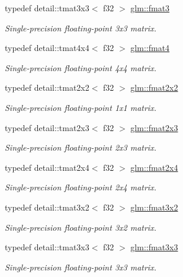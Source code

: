 \begin{DoxyCompactItemize}
typedef detail\-::tmat3x3$<$ f32 $>$ \hyperlink{group__gtc__type__precision_ga97f5385bc271a35cbbff8ac6a420c849}{glm\-::fmat3}
\begin{DoxyCompactList}\small\item\em Single-\/precision floating-\/point 3x3 matrix. \end{DoxyCompactList}\item 
typedef detail\-::tmat4x4$<$ f32 $>$ \hyperlink{group__gtc__type__precision_ga055416da4fe01f31008a03b52a80d174}{glm\-::fmat4}
\begin{DoxyCompactList}\small\item\em Single-\/precision floating-\/point 4x4 matrix. \end{DoxyCompactList}\item 
typedef detail\-::tmat2x2$<$ f32 $>$ \hyperlink{group__gtc__type__precision_ga36ec90579d358024a0609ae54c85c345}{glm\-::fmat2x2}
\begin{DoxyCompactList}\small\item\em Single-\/precision floating-\/point 1x1 matrix. \end{DoxyCompactList}\item 
typedef detail\-::tmat2x3$<$ f32 $>$ \hyperlink{group__gtc__type__precision_ga962841878f2520a9ac2859bc2bd467fb}{glm\-::fmat2x3}
\begin{DoxyCompactList}\small\item\em Single-\/precision floating-\/point 2x3 matrix. \end{DoxyCompactList}\item 
typedef detail\-::tmat2x4$<$ f32 $>$ \hyperlink{group__gtc__type__precision_gaf838bceea05a5b2fe2ea7bbb7d582b1a}{glm\-::fmat2x4}
\begin{DoxyCompactList}\small\item\em Single-\/precision floating-\/point 2x4 matrix. \end{DoxyCompactList}\item 
typedef detail\-::tmat3x2$<$ f32 $>$ \hyperlink{group__gtc__type__precision_ga8df314d9c425c283d4cec4047b8cf1f6}{glm\-::fmat3x2}
\begin{DoxyCompactList}\small\item\em Single-\/precision floating-\/point 3x2 matrix. \end{DoxyCompactList}\item 
typedef detail\-::tmat3x3$<$ f32 $>$ \hyperlink{group__gtc__type__precision_gab6848d63c51579e333fa69d335d2664a}{glm\-::fmat3x3}
\begin{DoxyCompactList}\small\item\em Single-\/precision floating-\/point 3x3 matrix. \end{DoxyCompactList}\item 

\end{DoxyCompactItemize}
